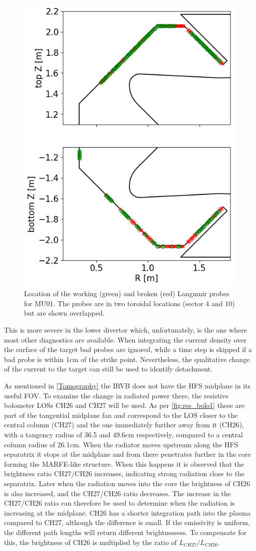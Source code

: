 \begin{figure}[!ht]
	\centering
	\includegraphics[trim={0 0 0 0},clip,width=0.5\linewidth]{Chapters/chapter2/figs/working_vs_bad_LPs.png}
	\caption{Location of the working (green) and broken (red) Langmuir probes for MU01. The probes are in two toroidal locations (sector 4 and 10) but are shown overlapped.}
	\label{fig:working_vs_bad_LPs}
\end{figure}

This is more severe in the lower divertor which, unfortunately, is the one where most other diagnostics are available. When integrating the current density over the surface of the target bad probes are ignored, while a time step is skipped  if a bad probe is within 1cm of the strike point. Nevertheless, the qualitative change of the current to the target can still be used to identify detachment.

As mentioned in \autoref{Tomography} the IRVB does not have the HFS midplane in its useful FOV. To examine the change in radiated power there, the resistive bolometer LOSs CH26 and CH27 will be used. As per \autoref{fig:res_bolo1} these are part of the tangential midplane fan and correspond to the LOS closer to the central column (CH27) and the one immediately further away from it (CH26), with a tangency radius of 36.5 and 49.6cm respectively, compared to a central column radius of 26.1cm.
When the radiator moves upstream along the HFS separatrix it stops at the midplane and from there penetrates further in the core forming the MARFE-like structure. When this happens it is observed that the brightness ratio CH27/CH26 increases, indicating strong radiation close to the separatrix. Later when the radiation moves into the core the brightness of CH26 is also increased, and the CH27/CH26 ratio decreases. The increase in the CH27/CH26 ratio can therefore be used to determine when the radiation is increasing at the midplane. CH26 has a shorter integration path into the plasma compared to CH27, although the difference is small. If the emissivity is uniform, the different path lengths will return different brightnessess. To compensate for this, the brightness of CH26 is multiplied by the ratio of $L_{CH27}/L_{CH26}$.


